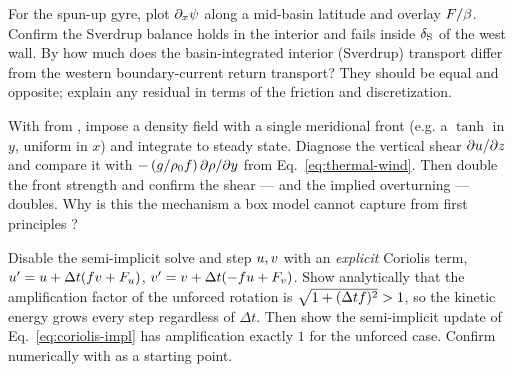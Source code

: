 \begin{exercise}\label{ex:sverdrup}
For the spun-up gyre, plot $\partial_x\psi$ along a mid-basin latitude and overlay $F/\beta$.
Confirm the Sverdrup balance holds in the interior and fails inside $\delta_{\mathrm{S}}$ of the west wall. By how
much does the basin-integrated interior (Sverdrup) transport differ from the western boundary-current
return transport? They should be equal and opposite; explain any residual in terms of the friction and
discretization.
\end{exercise}

\begin{exercise}
With  from , impose a
density field with a single meridional front (e.g. a $\tanh$ in $y$, uniform in $x$) and integrate to
steady state. Diagnose the vertical shear $\partial u/\partial z$ and compare it with
$-\,(g/\rho_0f)\,\partial\rho/\partial y$ from Eq.~\eqref{eq:thermal-wind}. Then double the
front strength and confirm the shear --- and the implied overturning --- doubles. Why is this the
mechanism a box model cannot capture from first principles \citep{marotzke1991}?
\end{exercise}

\begin{exercise}
Disable the semi-implicit solve and step $u,v$ with an \emph{explicit} Coriolis term,
$u'=u+\Delta t(fv+F_u)$, $v'=v+\Delta t(-fu+F_v)$. Show analytically that the
amplification factor of the unforced rotation is $\sqrt{1+(\Delta tf)^2}>1$, so the kinetic energy
grows every step regardless of $\Delta t$. Then show the semi-implicit update of
Eq.~\eqref{eq:coriolis-impl} has amplification exactly $1$ for the unforced case. Confirm numerically
with  as a starting point.
\end{exercise}
